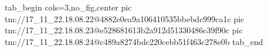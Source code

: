  
 
 
 
 

\qqSecOrig


\ifcmt
  tab_begin cols=3,no_fig,center
    pic tm://17_11_22.18.08.22@4882e0ea9a106410535bbebdc999ca1c
    pic tm://17_11_22.18.08.23@e528681613b2a912d51330486c39f90c
    pic tm://17_11_22.18.08.24@c489a8274bdc220cebb51f463c278e0b
  tab_end
\fi


